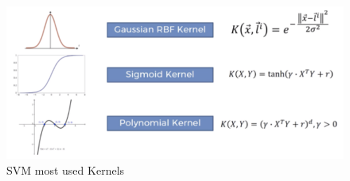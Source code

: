 
\begin{figure}[h]
\centering
\includegraphics[width=14cm]{figures/Ch2/Kernels.pdf}
\caption{SVM most used Kernels}
\label{f:SVM-kernels}
\end{figure}




